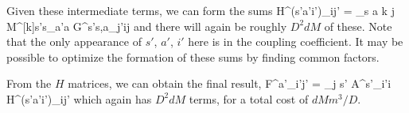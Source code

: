 \documentclass{article}[10pt]
\begin{document}
Given these intermediate terms, we can form the sums
\beq
H^{(s'a'i')}_{ij'} = \sum_{s a k j}
 \:
M^{[k]s's}_{a'a}
G^{s's,a}_{j'ij}
\eeq
and there will again be roughly $D^2 dM$ of these.
Note that the only appearance of $s'$, $a'$, $i'$ here is in the coupling coefficient.
It may be possible to optimize the formation of these sums by finding common factors.

From the $H$ matrices, we can obtain the final result,
\beq
F^{a'}_{i'j'} = \sum_{j s'} A^{s'}_{i'i} H^{(s'a'i')}_{ij'}
\eeq
which again has $D^2 dM$ terms, for a total cost of $d M m^3 / D$.
\end{document}
